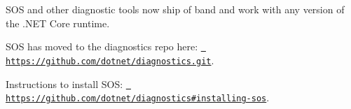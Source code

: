 SOS and other diagnostic tools now ship of band and work with any version of the .NET Core runtime.

SOS has moved to the diagnostics repo here\+: \href{https://github.com/dotnet/diagnostics.git}{\texttt{ https\+://github.\+com/dotnet/diagnostics.\+git}}.

Instructions to install SOS\+: \href{https://github.com/dotnet/diagnostics\#installing-sos}{\texttt{ https\+://github.\+com/dotnet/diagnostics\#installing-\/sos}}. 